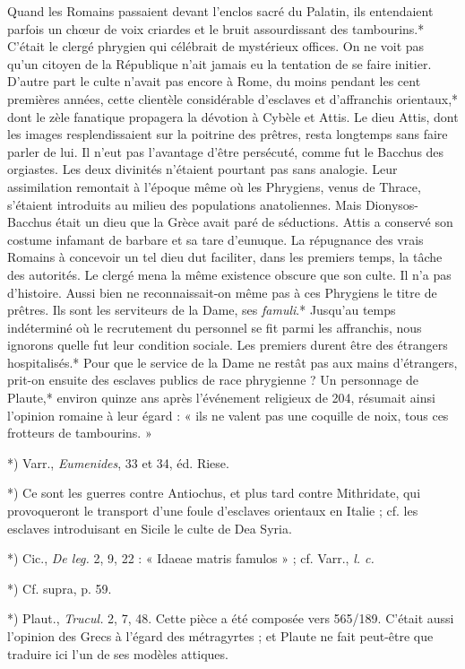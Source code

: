 \documentclass[a4paper, 11pt, oneside, polutonikogreek, french]{article}
\begin{document}
Quand les Romains passaient devant l'enclos sacré du Palatin, ils entendaient parfois un chœur de voix criardes et le bruit assourdissant des tambourins.* C'était le clergé phrygien qui célébrait de mystérieux offices. On ne voit pas qu'un citoyen de la République n'ait jamais eu la tentation de se faire initier. D'autre part le culte n'avait pas encore à Rome, du moins pendant les cent premières années, cette clientèle considérable d'esclaves et d'affranchis orientaux,* dont le zèle fanatique propagera la dévotion à Cybèle et Attis. Le dieu Attis, dont les images resplendissaient sur la poitrine des prêtres, resta longtemps sans faire parler de lui. Il n'eut pas l'avantage d'être persécuté, comme fut le Bacchus des orgiastes. Les deux divinités n'étaient pourtant pas sans analogie. Leur assimilation remontait à l'époque même où les Phrygiens, venus de Thrace, s'étaient introduits au milieu des populations anatoliennes. Mais Dionysos-Bacchus était un dieu que la Grèce avait paré de séductions. Attis a conservé son costume infamant de barbare et sa tare d'eunuque. La répugnance des vrais Romains à concevoir un tel dieu dut faciliter, dans les premiers temps, la tâche des autorités. Le clergé mena la même existence obscure que son culte. Il n'a pas d'histoire. Aussi bien ne reconnaissait-on même pas à ces Phrygiens le titre de prêtres. Ils sont les serviteurs de la Dame, ses \emph{famuli}.* Jusqu'au temps indéterminé où le recrutement du personnel se fit parmi les affranchis, nous ignorons quelle fut leur condition sociale. Les premiers durent être des étrangers hospitalisés.* Pour que le service de la Dame ne restât pas aux mains d'étrangers, prit-on ensuite des esclaves publics de race phrygienne ? Un personnage de Plaute,* environ quinze ans après l'événement religieux de 204, résumait ainsi l'opinion romaine à leur égard : « ils ne valent pas une coquille de noix, tous ces frotteurs de tambourins. »

*) Varr., \emph{Eumenides}, 33 et 34, éd. Riese.

*) Ce sont les guerres contre Antiochus, et plus tard contre Mithridate, qui provoqueront le transport d'une foule d'esclaves orientaux en Italie ; cf. les esclaves introduisant en Sicile le culte de Dea Syria.

*) Cic., \emph{De leg.} 2, 9, 22 : « Idaeae matris famulos » ; cf. Varr., \emph{l. c.}

*) Cf. supra, p. 59.

*) Plaut., \emph{Trucul.} 2, 7, 48. Cette pièce a été composée vers 565/189. C'était aussi l'opinion des Grecs à l'égard des métragyrtes ; et Plaute ne fait peut-être que traduire ici l'un de ses modèles attiques.
\end{document}
